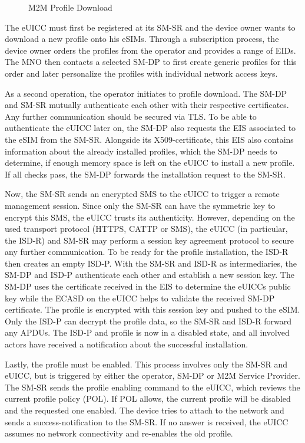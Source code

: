 \begin{figure}[ht]
    \centering
    \fontsize{7.7}{9.3}\selectfont
    
    \caption{M2M Profile Download}
    \label{fig:m2m_download}
\end{figure}

The eUICC must first be registered at its SM-SR and the device owner wants to download a new profile onto his eSIMs. Through a subscription process, the device owner orders the profiles from the operator and provides a range of EIDs. The MNO then contacts a selected SM-DP to first create generic profiles for this order and later personalize the profiles with individual network access keys. 

As a second operation, the operator initiates to profile download. The SM-DP and SM-SR mutually authenticate each other with their respective certificates. Any further communication should be secured via TLS. To be able to authenticate the eUICC later on, the SM-DP also requests the EIS associated to the eSIM from the SM-SR. Alongside its X509-certificate, this EIS also contains information about the already installed profiles, which the SM-DP needs to determine, if enough memory space is left on the eUICC to install a new profile. If all checks pass, the SM-DP forwards the installation request to the SM-SR.

Now, the SM-SR sends an encrypted SMS to the eUICC to trigger a remote management session. Since only the SM-SR can have the symmetric key to encrypt this SMS, the eUICC trusts its authenticity. However, depending on the used transport protocol (HTTPS, \acrshort{CATTP} or SMS), the eUICC (in particular, the ISD-R) and SM-SR may perform a session key agreement protocol to secure any further communication. To be ready for the profile installation, the ISD-R then creates an empty ISD-P. With the SM-SR and ISD-R as intermediaries, the SM-DP and ISD-P authenticate each other and establish a new session key. The SM-DP uses the certificate received in the EIS to determine the eUICCs public key while the ECASD on the eUICC helps to validate the received SM-DP certificate. The profile is encrypted with this session key and pushed to the eSIM. Only the ISD-P can decrypt the profile data, so the SM-SR and ISD-R forward any APDUs. The ISD-P and profile is now in a disabled state, and all involved actors have received a notification about the successful installation.

Lastly, the profile must be enabled. This process involves only the SM-SR and eUICC, but is triggered by either the operator, SM-DP or M2M Service Provider. The SM-SR sends the profile enabling command to the eUICC, which reviews the current profile policy (POL). If POL allows, the current profile will be disabled and the requested one enabled. The device tries to attach to the network and sends a success-notification to the SM-SR. If no answer is received, the eUICC assumes no network connectivity and re-enables the old profile.

